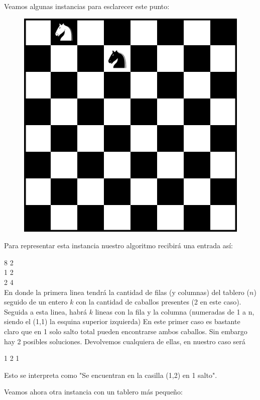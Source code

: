 \documentclass[11pt, a4paper, twoside]{article}
\begin{document}
Veamos algunas instancias para esclarecer este punto:

\begin{figure}[H]
\centering
\includegraphics[scale=0.25]{imagenes/chess1.jpg}
\caption{}
\end{figure} 

Para representar esta instancia nuestro algoritmo recibirá una entrada así:

8 2 \\
1 2\\
2 4\\

En donde la primera linea tendrá la cantidad de filas (y columnas) del tablero ($n$) seguido de un entero $k$ con la cantidad de caballos presentes (2 en este caso). Seguida a esta linea, habrá $k$ lineas con la fila y la columna (numeradas de 1 a n, siendo el (1,1) la esquina superior izquierda)
En este primer caso es bastante claro que en 1 solo salto total pueden encontrarse ambos caballos. Sin embargo hay 2 posibles soluciones. Devolvemos cualquiera de ellas, en nuestro caso será

1 2 1

Esto se interpreta como "Se encuentran en la casilla (1,2) en 1 salto".

Veamos ahora otra instancia con un tablero más pequeño:
\end{document}
